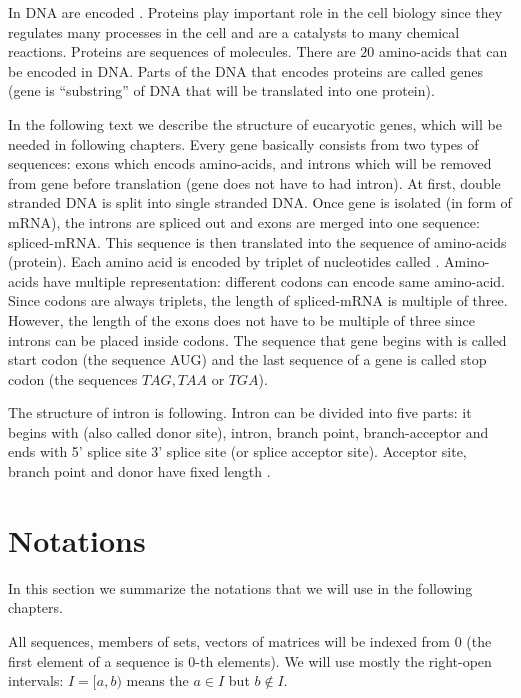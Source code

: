 In DNA are encoded . Proteins play important role in the
cell biology since  they regulates many processes in the cell and are a
catalysts to many chemical reactions. Proteins are sequences of
 molecules. There are $20$ amino-acids that can be
encoded in DNA. Parts of the DNA that encodes proteins are called genes (gene
is ``substring'' of DNA that will be translated into one protein).

In the following text we describe the structure of eucaryotic genes, which will be
needed in following chapters. Every gene basically consists from two types of
sequences: exons which encods amino-acids, and introns which will be removed
from gene before translation (gene does not have to had intron). At first,
double stranded DNA is split into single stranded DNA. Once gene is isolated (in
form of mRNA), the introns are spliced out and exons are merged into one
sequence: spliced-mRNA. This sequence is then translated into the sequence of
amino-acids (protein). Each amino acid is encoded by triplet of nucleotides
called . Amino-acids have multiple representation: different
codons can encode same amino-acid. Since codons are always triplets, the length
of spliced-mRNA is multiple of three. However, the length of the exons does not
have to be multiple of three since introns can be placed inside codons.  The
sequence that gene begins with is called start codon (the sequence AUG) and the
last sequence of a gene is called stop codon (the sequences $TAG,TAA$ or $TGA$).

The structure of intron is following. Intron can be divided into five parts: it
begins with (also called donor site), intron, branch point, branch-acceptor and
ends with 5' splice site  3' splice site (or splice acceptor site).  Acceptor
site, branch point and donor have fixed length
\cite{Pairagon2009,UnderstandingBioinformatics}.


\section{Notations}

In this section we summarize the notations that we will use in the following
chapters.

All sequences, members of sets, vectors of matrices will be indexed from $0$
(the first element of a sequence is $0$-th elements). We will use mostly
the right-open intervals: $I=[a,b)$ means the $a\in I$ but $b\notin I$. 

